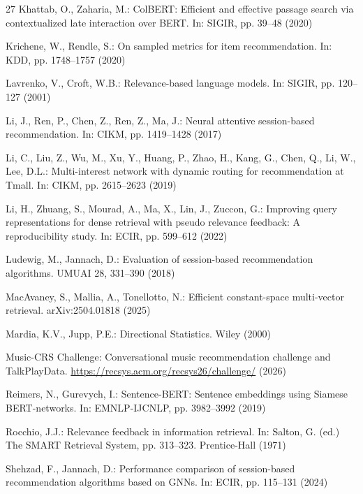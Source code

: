 \documentclass[runningheads]{llncs}
\begin{document}
\begin{thebibliography}{27}
Khattab, O., Zaharia, M.:
ColBERT: Efficient and effective passage search via contextualized late
interaction over BERT. In: SIGIR, pp. 39--48 (2020)

Krichene, W., Rendle, S.:
On sampled metrics for item recommendation.
In: KDD, pp. 1748--1757 (2020)

Lavrenko, V., Croft, W.B.:
Relevance-based language models. In: SIGIR, pp. 120--127 (2001)

Li, J., Ren, P., Chen, Z., Ren, Z., Ma, J.:
Neural attentive session-based recommendation.
In: CIKM, pp. 1419--1428 (2017)

Li, C., Liu, Z., Wu, M., Xu, Y., Huang, P., Zhao, H., Kang, G., Chen, Q.,
Li, W., Lee, D.L.:
Multi-interest network with dynamic routing for recommendation at Tmall.
In: CIKM, pp. 2615--2623 (2019)

Li, H., Zhuang, S., Mourad, A., Ma, X., Lin, J., Zuccon, G.:
Improving query representations for dense retrieval with pseudo relevance
feedback: A reproducibility study. In: ECIR, pp. 599--612 (2022)

Ludewig, M., Jannach, D.:
Evaluation of session-based recommendation algorithms.
UMUAI 28, 331--390 (2018)

MacAvaney, S., Mallia, A., Tonellotto, N.:
Efficient constant-space multi-vector retrieval. arXiv:2504.01818 (2025)

Mardia, K.V., Jupp, P.E.:
Directional Statistics. Wiley (2000)

Music-CRS Challenge:
Conversational music recommendation challenge and TalkPlayData.
\url{https://recsys.acm.org/recsys26/challenge/} (2026)

Reimers, N., Gurevych, I.:
Sentence-BERT: Sentence embeddings using Siamese BERT-networks.
In: EMNLP-IJCNLP, pp. 3982--3992 (2019)

Rocchio, J.J.:
Relevance feedback in information retrieval.
In: Salton, G. (ed.) The SMART Retrieval System, pp. 313--323.
Prentice-Hall (1971)

Shehzad, F., Jannach, D.:
Performance comparison of session-based recommendation algorithms based on
GNNs. In: ECIR, pp. 115--131 (2024)


\end{thebibliography}
\end{document}
